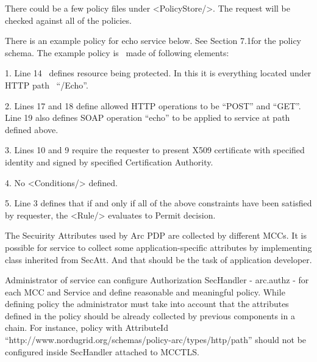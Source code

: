 \documentclass{article}
\begin{document}
{\color{black}
There could be a few policy files under
{\textless}PolicyStore/{\textgreater}. The request will be checked
against all of the policies.}

{\upshape\color{black}
There is an example policy for echo service below. See Section 7.1for
the policy schema. The example policy is \ made of following elements:
}

{\color{black}
1. Line 14 \ defines resource being protected. In this it is everything
located under HTTP path
\ {\textquotedblleft}/Echo{\textquotedblright}.}

{\color{black}
2. Lines 17 and 18 define allowed HTTP operations to be
{\textquotedblleft}POST{\textquotedblright} and
{\textquotedblleft}GET{\textquotedblright}. Line 19 also defines SOAP
operation {\textquotedblleft}echo{\textquotedblright} to be applied to
service at path defined above.}

{\color{black}
3. Lines 10 and 9 require the requester to present X509 certificate with
specified identity and signed by specified Certification Authority.}

{\color{black}
4. No {\textless}Conditions/{\textgreater} defined.}

{\color{black}
5. Line 3 defines that if and only if all of the above constraints have
been satisfied by requester, the {\textless}Rule/{\textgreater}
evaluates to Permit decision.}

{\color{black}
The Secuirity Attributes used by Arc PDP are collected by different
MCCs. It is possible for service to collect some application-specific
attributes by implementing class inherited from SecAtt. And that should
be the task of application developer.}

{\upshape\color{black}
Administrator of service can configure Authorization SecHandler -
arc.authz - for each MCC and Service and define reasonable and
meaningful policy. While defining policy the administrator must take
into account that the attributes defined in the policy should be
already collected by previous components in a chain. For instance,
policy with AttributeId
{\textquotedblleft}http://www.nordugrid.org/schemas/policy-arc/types/http/path{\textquotedblright}
should not be configured inside SecHandler attached to MCCTLS. }
\end{document}
